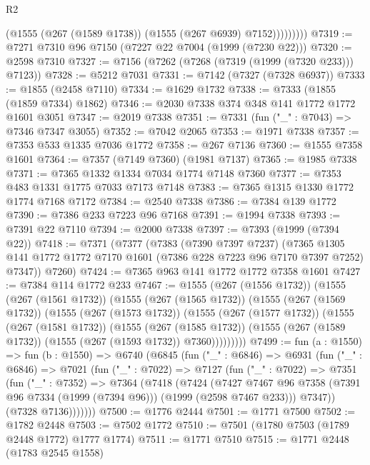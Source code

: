 \begin{lexlean}{R2}
\begin{coremodule}
                  (@1555 (@267 (@1589 @1738)) (@1555 (@267 @6939) @7152)))))))))
@7319 := @7271 @7310 @96 @7150 (@7227 @22 @7004 (@1999 (@7230 @22)))
@7320 := @2598 @7310
@7327 := @7156 (@7262 (@7268 (@7319 (@1999 (@7320 @233))) @7123))
@7328 := @5212 @7031
@7331 := @7142 (@7327 (@7328 @6937))
@7333 := @1855 (@2458 @7110)
@7334 := @1629 @1732
@7338 := @7333 (@1855 (@1859 @7334) @1862)
@7346 := @2030 @7338 @374 @348 @141 @1772 @1772 @1601 @3051
@7347 := @2019 @7338
@7351 := @7331 (fun ("_" : @7043) => @7346 @7347 @3055)
@7352 := @7042 @2065
@7353 := @1971 @7338
@7357 := @7353 @533 @1335 @7036 @1772
@7358 := @267 @7136
@7360 := @1555 @7358 @1601
@7364 := @7357 (@7149 @7360) (@1981 @7137)
@7365 := @1985 @7338
@7371 := @7365 @1332 @1334 @7034 @1774 @7148 @7360
@7377 := @7353 @483 @1331 @1775 @7033 @7173 @7148
@7383 := @7365 @1315 @1330 @1772 @1774 @7168 @7172
@7384 := @2540 @7338
@7386 := @7384 @139 @1772
@7390 := @7386 @233 @7223 @96 @7168
@7391 := @1994 @7338
@7393 := @7391 @22 @7110
@7394 := @2000 @7338
@7397 := @7393 (@1999 (@7394 @22))
@7418 := @7371
    (@7377
      (@7383
        (@7390 @7397 @7237)
        (@7365 @1305 @141 @1772 @1772 @7170 @1601 (@7386 @228 @7223 @96 @7170 @7397 @7252) @7347))
      @7260)
@7424 := @7365 @963 @141 @1772 @1772 @7358 @1601
@7427 := @7384 @114 @1772 @233
@7467 := @1555
    (@267 (@1556 @1732))
    (@1555
      (@267 (@1561 @1732))
      (@1555
        (@267 (@1565 @1732))
        (@1555
          (@267 (@1569 @1732))
          (@1555
            (@267 (@1573 @1732))
            (@1555
              (@267 (@1577 @1732))
              (@1555
                (@267 (@1581 @1732))
                (@1555
                  (@267 (@1585 @1732))
                  (@1555 (@267 (@1589 @1732)) (@1555 (@267 (@1593 @1732)) @7360)))))))))
@7499 := fun (a : @1550) =>
  fun (b : @1550) =>
  @6740
    (@6845
      (fun ("_" : @6846) =>
      @6931
        (fun ("_" : @6846) =>
        @7021
          (fun ("_" : @7022) =>
          @7127
            (fun ("_" : @7022) =>
            @7351
              (fun ("_" : @7352) =>
              @7364
                (@7418
                  (@7424
                    (@7427
                      @7467
                      @96
                      @7358
                      (@7391 @96 @7334 (@1999 (@7394 @96)))
                      (@1999 (@2598 @7467 @233)))
                    @7347))
                (@7328 @7136)))))))
@7500 := @1776 @2444
@7501 := @1771 @7500
@7502 := @1782 @2448
@7503 := @7502 @1772
@7510 := @7501 (@1780 @7503 (@1789 @2448 @1772) @1777 @1774)
@7511 := @1771 @7510
@7515 := @1771 @2448 (@1783 @2545 @1558)

\end{coremodule}
\end{lexlean}
